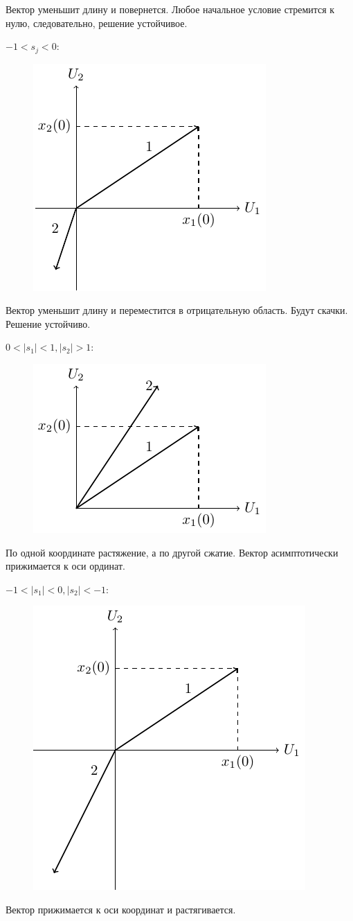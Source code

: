 Вектор уменьшит длину и повернется. Любое начальное условие стремится к нулю, следовательно, решение устойчивое.

$-1<s_j<0$:
\begin{figure}[H]
	\centering
	\includegraphics[width=0.35\linewidth]{fig/fig35.pdf}   
\end{figure}

Вектор уменьшит длину и переместится в отрицательную область. Будут скачки. Решение устойчиво.

$0<|s_1|<1, |s_2|>1$:
\begin{figure}[H]
	\centering
	\includegraphics[width=0.35\linewidth]{fig/fig36.pdf}   
\end{figure}

По одной координате растяжение, а по другой сжатие. Вектор асимптотически прижимается к оси ординат.

$-1<|s_1|<0, |s_2|<-1$:
\begin{figure}[H]
	\centering
	\includegraphics[width=0.35\linewidth]{fig/fig37.pdf}   
\end{figure}

Вектор прижимается к оси координат и растягивается.

{}